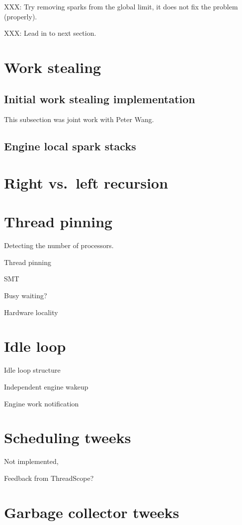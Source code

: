 XXX: Try removing sparks from the global limit,
it does not fix the problem (properly).

XXX: Lead in to next section.


\section{Work stealing}

\subsection{Initial work stealing implementation}

This subsection was joint work with Peter Wang.

\subsection{Engine local spark stacks}

\section{Right vs.\ left recursion}

\section{Thread pinning}

Detecting the number of processors.

Thread pinning

SMT

Busy waiting?

Hardware locality

\section{Idle loop}

Idle loop structure

Independent engine wakeup

Engine work notification

\section{Scheduling tweeks}

Not implemented,

Feedback from ThreadScope?

\section{Garbage collector tweeks}

